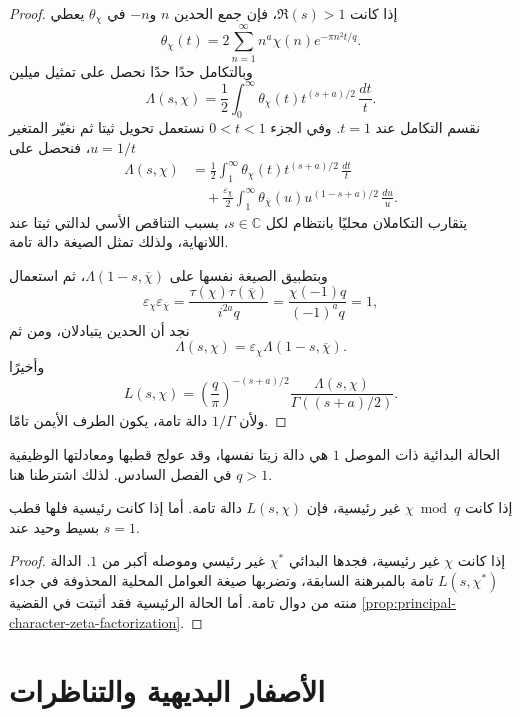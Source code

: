 \begin{proof}
إذا كانت \(\Re(s)>1\)، فإن جمع الحدين \(n\) و\(-n\) في
\(\theta_\chi\) يعطي
\[
\theta_\chi(t)
=2\sum_{n=1}^{\infty}n^a\chi(n)
 e^{-\pi n^2t/q}.
\]
وبالتكامل حدًا حدًا نحصل على تمثيل ميلين
\[
\Lambda(s,\chi)
=
\frac12\int_0^\infty
\theta_\chi(t)t^{(s+a)/2}\,\frac{dt}{t}.
\]
نقسم التكامل عند \(t=1\). وفي الجزء \(0<t<1\) نستعمل تحويل
ثيتا ثم نغيّر المتغير \(u=1/t\)، فنحصل على
\begin{align*}
\Lambda(s,\chi)
&=
\frac12\int_1^\infty
\theta_\chi(t)t^{(s+a)/2}\,\frac{dt}{t}\\
&\quad+
\frac{\varepsilon_\chi}{2}\int_1^\infty
\theta_{\overline\chi}(u)u^{(1-s+a)/2}\,\frac{du}{u}.
\end{align*}
يتقارب التكاملان محليًا بانتظام لكل \(s\in\mathbb C\)، بسبب التناقص
الأسي لدالتي ثيتا عند اللانهاية، ولذلك تمثل الصيغة دالة تامة.

وبتطبيق الصيغة نفسها على \(\Lambda(1-s,\overline\chi)\)، ثم استعمال
\[
\varepsilon_\chi\varepsilon_{\overline\chi}
=
\frac{\tau(\chi)\tau(\overline\chi)}{i^{2a}q}
=
\frac{\chi(-1)q}{(-1)^a q}
=1,
\]
نجد أن الحدين يتبادلان، ومن ثم
\[
\Lambda(s,\chi)
=
\varepsilon_\chi\Lambda(1-s,\overline\chi).
\]
وأخيرًا
\[
L(s,\chi)
=
\left(\frac q\pi\right)^{-(s+a)/2}
\frac{\Lambda(s,\chi)}{\Gamma((s+a)/2)}.
\]
ولأن \(1/\Gamma\) دالة تامة، يكون الطرف الأيمن تامًا.
\end{proof}

\begin{remark}
الحالة البدائية ذات الموصل \(1\) هي دالة زيتا نفسها، وقد عولج قطبها
ومعادلتها الوظيفية في الفصل السادس. لذلك اشترطنا هنا \(q>1\).
\end{remark}

\begin{corollary}
\label{cor:all-nonprincipal-entire}
\provedhere
إذا كانت \(\chi\bmod q\) غير رئيسية، فإن \(L(s,\chi)\) دالة تامة.
أما إذا كانت رئيسية فلها قطب بسيط وحيد عند \(s=1\).
\end{corollary}

\begin{proof}
إذا كانت \(\chi\) غير رئيسية، فجدها البدائي \(\chi^{*}\) غير رئيسي
وموصله أكبر من \(1\). الدالة \(L(s,\chi^{*})\) تامة بالمبرهنة السابقة،
وتضربها صيغة العوامل المحلية المحذوفة في جداء منته من دوال تامة. أما
الحالة الرئيسية فقد أثبتت في القضية
\ref{prop:principal-character-zeta-factorization}.
\end{proof}

\section{الأصفار البديهية والتناظرات}

